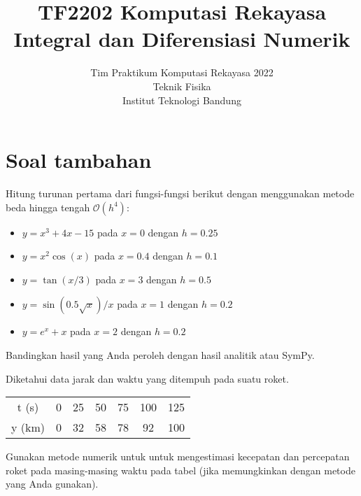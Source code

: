 



\title{%
{\small TF2202 Komputasi Rekayasa}\\
Integral dan Diferensiasi Numerik
}
\author{Tim Praktikum Komputasi Rekayasa 2022\\
Teknik Fisika\\
Institut Teknologi Bandung}
\date{}
\maketitle








\section{Soal tambahan}







\begin{soal}
Hitung turunan pertama dari fungsi-fungsi berikut dengan menggunakan metode beda hingga
tengah $\mathcal{O}(h^4)$:
\begin{itemize}
\item $y = x^3 + 4x - 15$ pada $x=0$ dengan $h=0.25$
\item $y = x^2 \cos(x)$ pada $x=0.4$ dengan $h=0.1$
\item $y = \tan(x/3)$ pada $x=3$ dengan $h=0.5$
\item $y = \sin(0.5\sqrt{x})/x$ pada $x=1$ dengan $h=0.2$
\item $y = e^{x} + x$ pada $x=2$ dengan $h=0.2$
\end{itemize}
Bandingkan hasil yang Anda peroleh dengan hasil analitik atau SymPy.
\end{soal}


\begin{soal}
Diketahui data jarak dan waktu yang ditempuh pada suatu roket.

{\centering
\begin{tabular}{|c|cccccc|}
\hline
t (s)  & 0 & 25 & 50 & 75 & 100 & 125 \\
y (km) & 0 & 32 & 58 & 78 &  92 & 100 \\
\hline
\end{tabular}
\par}

Gunakan metode numerik untuk untuk mengestimasi kecepatan dan percepatan roket
pada masing-masing waktu pada tabel (jika memungkinkan dengan metode yang Anda
gunakan).
\end{soal}





